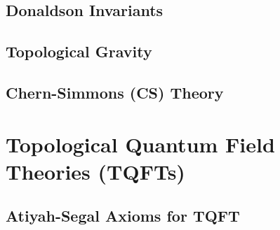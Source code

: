\subsection{Donaldson Invariants}

\subsection{Topological Gravity}

\subsection{Chern-Simmons (CS) Theory}

\section{Topological Quantum Field Theories (TQFTs)}

\subsection{Atiyah-Segal Axioms for TQFT}